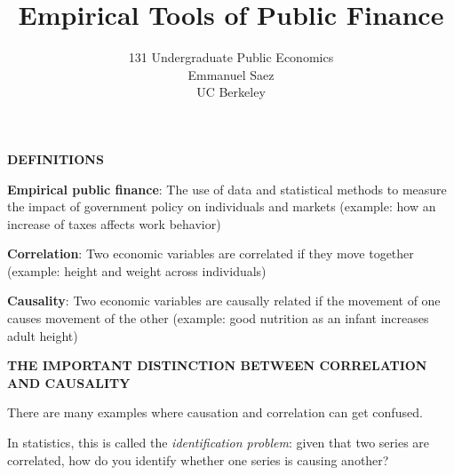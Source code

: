 \documentclass[landscape]{slides}
\author{131 Undergraduate Public Economics \\ Emmanuel Saez \\ UC Berkeley}
\date{}
\title{Empirical Tools of Public Finance} \onlyslides{1-300}
\begin{document}
\begin{slide}
\maketitle
\end{slide}

%
%
%
%

\begin{slide}
\begin{center}
{\bf DEFINITIONS}
\end{center}

{\bf Empirical public finance}:
The use of data and statistical methods to measure the impact of government policy on individuals and markets
(example: how an increase of taxes affects work behavior)

{\bf Correlation}:
Two economic variables are correlated if they move together (example: height and weight across individuals)

{\bf Causality}:
Two economic variables are causally related if the movement of one causes movement of the other
(example: good nutrition as an infant increases adult height)

\end{slide}


\begin{slide}
\begin{center}
{\bf THE IMPORTANT DISTINCTION BETWEEN CORRELATION AND CAUSALITY}
\end{center}

There are many examples where causation and correlation can get confused.

In statistics, this is called the \emph{identification problem}: given that two series are correlated, how do you identify whether one series is causing another?


\end{slide}
\end{document}
